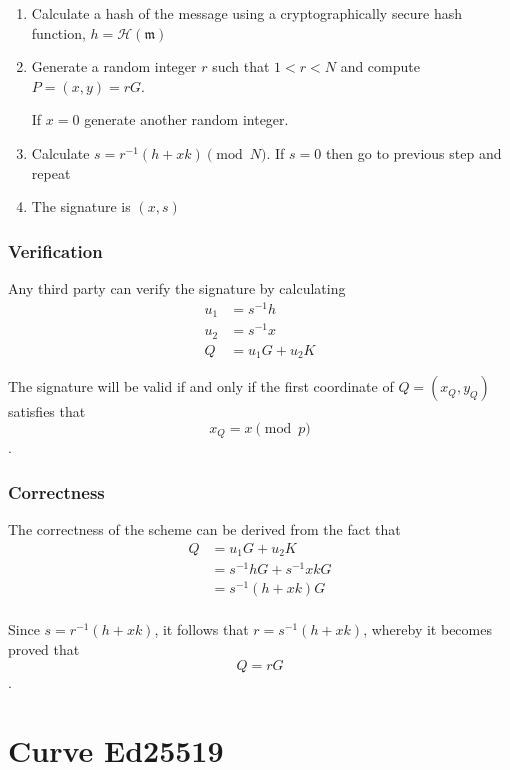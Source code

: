 \begin{enumerate}
	
	\item Calculate a hash of the message using a cryptographically secure hash function, \(h = \mathcal{H}(\mathfrak{m})\)
	
	\item Generate a random integer \(r\) such that \(1 < r < N\) and compute \(P = (x, y) = r G\). 

       If \(x = 0\) generate another random integer.
	
	\item Calculate \(s = r^{-1} (h + x k) \pmod N\). If \(s = 0\) then go to previous step and repeat
	
	\item The signature is \((x, s)\)
\end{enumerate}


\subsubsection*{Verification}

Any third party can verify the signature by calculating
\begin{align*}
  u_1 & = s^{-1} h \\
  u_2 & = s^{-1} x \\
  Q   & = u_1 G + u_2 K
\end{align*}

The signature will be valid if and only if the first coordinate of \(Q = (x_Q, y_Q)\) satisfies that  
\[x_Q = x \pmod p\]. 

\subsubsection*{Correctness}

The correctness of the scheme can be derived from the fact that
\begin{align*}
Q &= u_1 G + u_2 K \\
  &= s^{-1} h G + s^{ -1} x k G \\
  &= s^{-1} (h + x k) G \\
\end{align*}

Since \(s = r^{-1} (h + x k) \), it follows that \(r = s^{-1}(h + x k)\), whereby it becomes proved that \[Q = r G\].

\section{Curve Ed25519}

